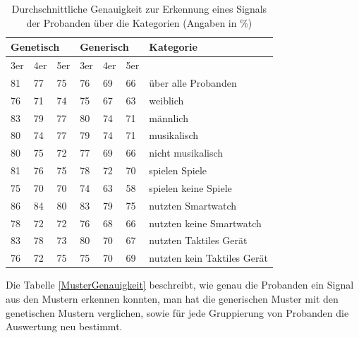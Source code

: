\begin{table}[]
\centering
\caption{Durchschnittliche Genauigkeit zur Erkennung eines Signals der Probanden über die Kategorien (Angaben in \%)}
\label{MusterGenauigkeit}
\begin{tabular}{llllll|l}
\hline
\multicolumn{3}{l}{Genetisch} & \multicolumn{3}{l|}{Generisch} & Kategorie      \\ \hline
3er    & 4er    & 5er   & 3er    & 4er    & 5er   &                             \\ \hline
81     & 77     & 75    & 76     & 69     & 66    & über alle Probanden         \\ \hline
76     & 71     & 74    & 75     & 67     & 63    & weiblich                    \\
83     & 79     & 77    & 80     & 74     & 71    & männlich                    \\ \hline
80     & 74     & 77    & 79     & 74     & 71    & musikalisch                 \\
80     & 75     & 72    & 77     & 69     & 66    & nicht musikalisch           \\ \hline
81     & 76     & 75    & 78     & 72     & 70    & spielen Spiele              \\
75     & 70     & 70    & 74     & 63     & 58    & spielen keine Spiele        \\ \hline
86     & 84     & 80    & 83     & 79     & 75    & nutzten Smartwatch          \\
78     & 72     & 72    & 76     & 68     & 66    & nutzten keine Smartwatch    \\ \hline
83     & 78     & 73    & 80     & 70     & 67    & nutzten Taktiles Gerät      \\
76     & 72     & 75    & 75     & 70     & 69    & nutzten kein Taktiles Gerät
\end{tabular}
\end{table}

Die Tabelle \autoref{MusterGenauigkeit} beschreibt, wie genau die Probanden ein Signal aus den Mustern erkennen konnten, man hat die generischen Muster mit den genetischen Mustern verglichen, sowie für jede Gruppierung von Probanden die Auswertung neu bestimmt. 

